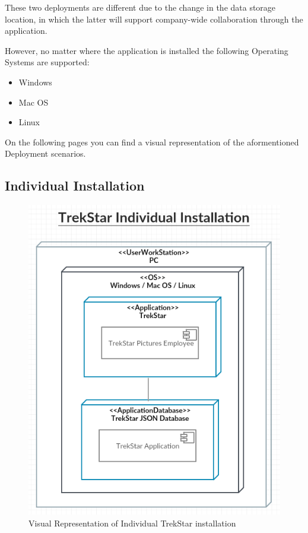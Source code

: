\documentclass[
  english,
  a4paper,
,tablecaptionabove
]{scrartcl}
\providecommand{\tightlist}{%
  \setlength{\itemsep}{0pt}\setlength{\parskip}{0pt}}
\begin{document}
These two deployments are different due to the change in the data
storage location, in which the latter will support company-wide
collaboration through the application.

However, no matter where the application is installed the following
Operating Systems are supported:

\begin{itemize}
\tightlist
\item
  Windows
\item
  Mac OS
\item
  Linux
\end{itemize}

On the following pages you can find a visual representation of the
aformentioned Deployment scenarios.

\hypertarget{individual-installation}{%
\subsection{Individual Installation}\label{individual-installation}}

\begin{figure}
\centering
\includegraphics{images/deployment-diagrams/trekstar-individual-installation.png}
\caption{Visual Representation of Individual TrekStar installation}
\end{figure}
\end{document}
